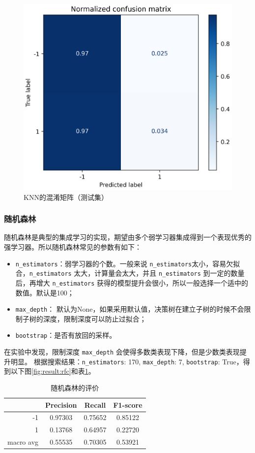 \documentclass[a4paper]{article}
\begin{document}
\begin{figure}[!h]
    \centering
    \includegraphics[width=0.48\linewidth]{KNN_confus_mat-norm.png}
    \caption{KNN的混淆矩阵（测试集）}
    \label{fig:result:knn}
\end{figure}

\subsubsection{随机森林}
随机森林是典型的集成学习的实现，期望由多个弱学习器集成得到一个表现优秀的强学习器。所以随机森林常见的参数有如下：
\begin{itemize}
    \item \texttt{n\_estimators}：弱学习器的个数。一般来说 \texttt{n\_estimators}太小，容易欠拟合，\texttt{n\_estimators} 太大，计算量会太大，并且 \texttt{n\_estimators} 到一定的数量后，再增大 \texttt{n\_estimators} 获得的模型提升会很小，所以一般选择一个适中的数值。默认是100；
    \item \texttt{max\_depth}： 默认为None，如果采用默认值，决策树在建立子树的时候不会限制子树的深度，限制深度可以防止过拟合；
    \item \texttt{bootstrap}：是否有放回的采样。
\end{itemize}

在实验中发现，限制深度 \texttt{max\_depth} 会使得多数类表现下降，但是少数类表现提升明显。
根据搜索结果：\texttt{n\_estimators}: 170, \texttt{max\_depth}: 7, \texttt{bootstrap}: True，得到以下图\ref{fig:result:rfc}和表\ref{tb:rfc}。

\begin{table}[!h]
    \centering
    \renewcommand{\arraystretch}{1.5}
    \begin{tabular}{|r|c|c|c|}
        \hline
                  & Precision & Recall & F1-score \\ \hline
        -1        &     0.97303     &     0.75652   &    0.85122      \\ \hline
        1         &     0.13768      &     0.64957   &   0.22720       \\ \hline
        macro avg &      0.55535     &     0.70305   &    0.53921      \\ \hline
    \end{tabular}
    \caption{随机森林的评价}
    \label{tb:rfc}
\end{table}
\end{document}
